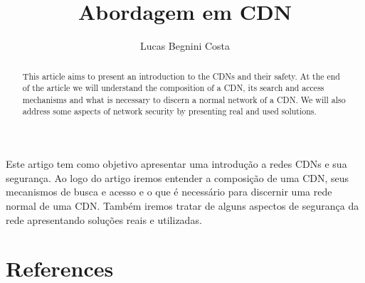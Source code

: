 \documentclass[12pt]{article}
\title{Abordagem em CDN}
\author{Lucas Begnini Costa\inst{1}}
\begin{document}
 

\maketitle

\begin{resumo} 
Este artigo tem como objetivo apresentar uma introdu\c{c}\~ao a redes CDNs e sua seguran\c{c}a. Ao logo do artigo iremos entender a composi\c{c}\~ao de uma CDN, seus mecanismos de busca e acesso e o que \'e necess\'ario para discernir uma rede normal de uma CDN. Tamb\'em iremos tratar de alguns aspectos de seguran\c{c}a da rede apresentando solu\c{c}\~oes reais e utilizadas.
\end{resumo}

\begin{abstract}
This article aims to present an introduction to the CDNs and their safety. At the end of the article we will understand the composition of a CDN, its search and access mechanisms and what is necessary to discern a normal network of a CDN. We will also address some aspects of network security by presenting real and used solutions.
\end{abstract}
 
\maketitle

\tableofcontents %
\listoftables %
\listoffigures %
     








\newpage
\section{References}



\end{document}
